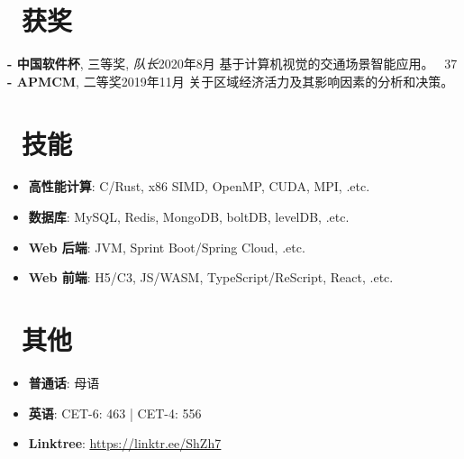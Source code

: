 \documentclass{common}
\begin{document}
\section{\faTrophy\ 获奖}
\award
    {\textbf{- 中国软件杯}, 三等奖, \textit{队长}}{2020年8月}
    {基于计算机视觉的交通场景智能应用。 
        {\href{https://github.com/Sh-Zh-7/intelligent-transportation-system}{\underline{\faGithub}} \faStarO\ 37}
    }
\award
    {\textbf{- APMCM}, 二等奖}{2019年11月}
    {关于区域经济活力及其影响因素的分析和决策。}

\section{\faCogs\ 技能}
\begin{itemize}[parsep=0.5ex]
    \item \textbf{高性能计算}: C/Rust, x86 SIMD, OpenMP, CUDA, MPI, .etc.
    \item \textbf{数据库}: MySQL, Redis, MongoDB, boltDB, levelDB, .etc.
    \item \textbf{Web 后端}: JVM, Sprint Boot/Spring Cloud, .etc.
    \item \textbf{Web 前端}: H5/C3, JS/WASM, TypeScript/ReScript, React, .etc.
\end{itemize}

\section{\faInfo\ 其他}
\begin{itemize}[parsep=0.5ex]
    \item \textbf{普通话}: 母语
    \item \textbf{英语}: CET-6: 463 | CET-4: 556
    \item \textbf{Linktree}: \href{https://linktr.ee/ShZh7}{\underline{https://linktr.ee/ShZh7}}
\end{itemize}
\end{document}
